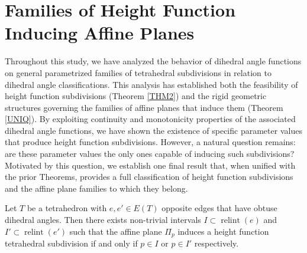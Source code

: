 \documentclass{mainresearch}
\begin{document}
\section{Families of Height Function Inducing Affine Planes}\label{SEC5}
Throughout this study, we have analyzed the behavior of dihedral angle functions on general parametrized families of tetrahedral subdivisions in relation to dihedral angle classifications. This analysis has established both the feasibility of height function subdivisions (Theorem \ref{THM2}) and the rigid geometric structures governing the families of affine planes that induce them (Theorem \ref{UNIQ}). By exploiting continuity and monotonicity properties of the associated dihedral angle functions, we have shown the existence of specific parameter values that produce height function subdivisions. However, a natural question remains: are these parameter values the only ones capable of inducing such subdivisions? Motivated by this question, we establish one final result that, when unified with the prior Theorems, provides a full classification of height function subdivisions and the affine plane families to which they belong.


\begin{thm}
	Let $T$ be a tetrahedron with $e,e'\in E(T)$ opposite edges that have obtuse dihedral angles. Then there exists non-trivial intervals $I\subset \operatorname{relint}(e)$ and $I'\subset \operatorname{relint}(e')$ such that the affine plane $\Pi_p$
	induces a height function tetrahedral subdivision if and only if $p\in I$ or $p\in I'$ respectively.
	
\end{thm}
\end{document}
